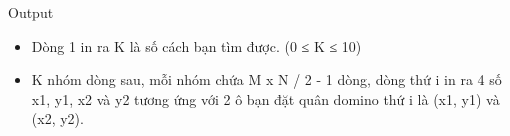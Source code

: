 Output  
\begin{itemize}
	\item     Dòng 1 in ra K là số cách bạn tìm được. (0 ≤ K ≤ 10)   
	\item     K nhóm dòng sau, mỗi nhóm chứa M x N / 2 - 1 dòng, dòng thứ i in ra 4 số x1, y1, x2 và y2 tương ứng với 2 ô bạn đặt quân domino thứ i là (x1, y1) và (x2, y2).   
\end{itemize}
